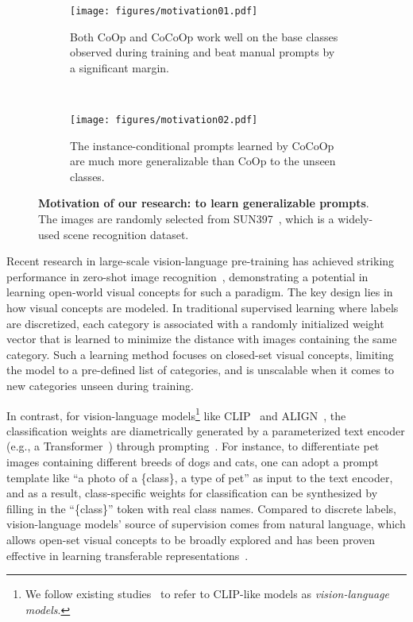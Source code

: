 \documentclass[10pt,twocolumn,letterpaper]{article}
\begin{document}
\begin{figure*}[t]
    \centering
    \begin{subfigure}[b]{\textwidth}
    \centering
    \texttt{[image: figures/motivation01.pdf]}
    \caption{Both CoOp and CoCoOp work well on the base classes observed during training and beat manual prompts by a significant margin.}
    \label{fig:motivation01}
    \end{subfigure}
    ~
    \begin{subfigure}[b]{\textwidth}
    \centering
    \texttt{[image: figures/motivation02.pdf]}
    \caption{The instance-conditional prompts learned by CoCoOp are much more generalizable than CoOp to the unseen classes.}
    \label{fig:motivation02}
    \end{subfigure}
    \caption{\textbf{Motivation of our research: to learn generalizable prompts}. The images are randomly selected from SUN397~\cite{xiao2010sun}, which is a widely-used scene recognition dataset.
    }
    \label{fig:motivation}
\end{figure*}

Recent research in large-scale vision-language pre-training has achieved striking performance in zero-shot image recognition~\cite{radford2021learning,jia2021scaling,furst2021cloob,li2021supervision}, demonstrating a potential in learning open-world visual concepts for such a paradigm. The key design lies in how visual concepts are modeled. In traditional supervised learning where labels are discretized, each category is associated with a randomly initialized weight vector that is learned to minimize the distance with images containing the same category. Such a learning method focuses on closed-set visual concepts, limiting the model to a pre-defined list of categories, and is unscalable when it comes to new categories unseen during training.

In contrast, for vision-language models\footnote{We follow existing studies~\cite{radford2021learning,jia2021scaling,furst2021cloob,li2021supervision} to refer to CLIP-like models as \emph{vision-language models}.} like CLIP~\cite{radford2021learning} and ALIGN~\cite{jia2021scaling}, the classification weights are diametrically generated by a parameterized text encoder (e.g., a Transformer~\cite{vaswani2017attention}) through prompting~\cite{liu2021pre}. For instance, to differentiate pet images containing different breeds of dogs and cats, one can adopt a prompt template like ``a photo of a \{class\}, a type of pet'' as input to the text encoder, and as a result, class-specific weights for classification can be synthesized by filling in the ``\{class\}'' token with real class names. Compared to discrete labels, vision-language models' source of supervision comes from natural language, which allows open-set visual concepts to be broadly explored and has been proven effective in learning transferable representations~\cite{radford2021learning,jia2021scaling}.
\end{document}
